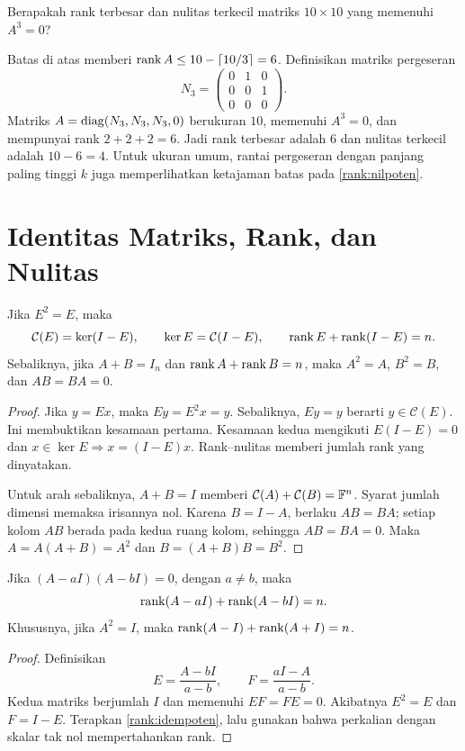 \begin{exam}
    Berapakah rank terbesar dan nulitas terkecil matriks $10\times10$
    yang memenuhi $A^3=0$?
\end{exam}
\begin{solution}
    Batas di atas memberi $\operatorname{rank} A\le10-\lceil10/3\rceil=6$.
    Definisikan matriks pergeseran
    \[
        N_3=\begin{pmatrix}0&1&0\\0&0&1\\0&0&0\end{pmatrix}.
    \]
    Matriks $A=\operatorname{diag}(N_3,N_3,N_3,0)$ berukuran $10$, memenuhi $A^3=0$,
    dan mempunyai rank $2+2+2=6$. Jadi rank terbesar adalah $6$ dan
    nulitas terkecil adalah $10-6=4$.
    Untuk ukuran umum, rantai pergeseran dengan panjang paling tinggi
    $k$ juga memperlihatkan ketajaman batas pada \autoref{rank:nilpoten}.
\end{solution}

\section{Identitas Matriks, Rank, dan Nulitas}
\label{rank:identitas}

\begin{teorema}
    Jika $E^2=E$, maka
    \[
        \mathcal C(E)=\ker(I-E),\qquad
        \ker E=\mathcal C(I-E),\qquad
        \operatorname{rank} E+\operatorname{rank}(I-E)=n.
    \]
    Sebaliknya, jika $A+B=I_n$ dan $\operatorname{rank} A+\operatorname{rank} B=n$, maka
    $A^2=A$, $B^2=B$, dan $AB=BA=0$.
\end{teorema}
\begin{proof}
    Jika $y=Ex$, maka $Ey=E^2x=y$. Sebaliknya, $Ey=y$ berarti
    $y\in\mathcal C(E)$. Ini membuktikan kesamaan pertama.
    Kesamaan kedua mengikuti $E(I-E)=0$ dan
    $x\in\ker E\Rightarrow x=(I-E)x$.
    Rank--nulitas memberi jumlah rank yang dinyatakan.

    Untuk arah sebaliknya, $A+B=I$ memberi
    $\mathcal C(A)+\mathcal C(B)=\mathbb{F}^n$. Syarat jumlah dimensi
    memaksa irisannya nol. Karena $B=I-A$, berlaku $AB=BA$;
    setiap kolom $AB$ berada pada kedua ruang kolom, sehingga $AB=BA=0$.
    Maka $A=A(A+B)=A^2$ dan $B=(A+B)B=B^2$.
\end{proof}

\begin{prop}
    \label{rank:kuadratik}
    Jika $(A-aI)(A-bI)=0$, dengan $a\ne b$, maka
    \[
        \operatorname{rank}(A-aI)+\operatorname{rank}(A-bI)=n.
    \]
    Khususnya, jika $A^2=I$, maka
    $\operatorname{rank}(A-I)+\operatorname{rank}(A+I)=n$.
\end{prop}
\begin{proof}
    Definisikan
    \[
        E=\frac{A-bI}{a-b},\qquad F=\frac{aI-A}{a-b}.
    \]
    Kedua matriks berjumlah $I$ dan memenuhi $EF=FE=0$.
    Akibatnya $E^2=E$ dan $F=I-E$. Terapkan
    \autoref{rank:idempoten}, lalu gunakan bahwa perkalian dengan
    skalar tak nol mempertahankan rank.
\end{proof}


